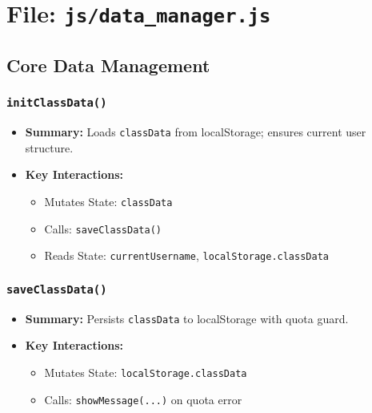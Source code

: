 \documentclass[11pt,letterpaper]{article}
\begin{document}
\section{File: \texttt{js/data\_manager.js}}

\subsection{Core Data Management}

\subsubsection{\texttt{initClassData()}}
\begin{itemize}
    \item \textbf{Summary:} Loads \texttt{classData} from localStorage; ensures current user structure.
    \item \textbf{Key Interactions:}
    \begin{itemize}
        \item Mutates State: \texttt{classData}
        \item Calls: \texttt{saveClassData()}
        \item Reads State: \texttt{currentUsername}, \texttt{localStorage.classData}
    \end{itemize}
\end{itemize}

\subsubsection{\texttt{saveClassData()}}
\begin{itemize}
    \item \textbf{Summary:} Persists \texttt{classData} to localStorage with quota guard.
    \item \textbf{Key Interactions:}
    \begin{itemize}
        \item Mutates State: \texttt{localStorage.classData}
        \item Calls: \texttt{showMessage(...)} on quota error
    \end{itemize}
\end{itemize}
\end{document}
